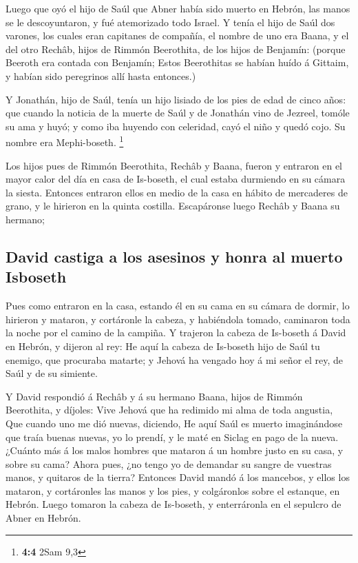  Luego que oyó el hijo de Saúl que Abner había sido muerto
en Hebrón, las manos se le descoyuntaron, y fué atemorizado todo Israel.
 Y tenía el hijo de Saúl dos varones, los cuales eran
capitanes de compañía, el nombre de uno era Baana, y el del otro Rechâb,
hijos de Rimmón Beerothita, de los hijos de Benjamín: (porque Beeroth
era contada con Benjamín;  Estos Beerothitas se habían
huído á Gittaim, y habían sido peregrinos allí hasta entonces.)

 Y Jonathán, hijo de Saúl, tenía un hijo lisiado de los
pies de edad de cinco años: que cuando la noticia de la muerte de Saúl y
de Jonathán vino de Jezreel, tomóle su ama y huyó; y como iba huyendo
con celeridad, cayó el niño y quedó cojo. Su nombre era Mephi-boseth.
\footnote{\textbf{4:4} 2Sam 9,3}

 Los hijos pues de Rimmón Beerothita, Rechâb y Baana,
fueron y entraron en el mayor calor del día en casa de Is-boseth, el
cual estaba durmiendo en su cámara la siesta.  Entonces
entraron ellos en medio de la casa en hábito de mercaderes de grano, y
le hirieron en la quinta costilla. Escapáronse luego Rechâb y Baana su
hermano;

\hypertarget{david-castiga-a-los-asesinos-y-honra-al-muerto-isboseth}{%
\subsection{David castiga a los asesinos y honra al muerto
Isboseth}\label{david-castiga-a-los-asesinos-y-honra-al-muerto-isboseth}}

 Pues como entraron en la casa, estando él en su cama en
su cámara de dormir, lo hirieron y mataron, y cortáronle la cabeza, y
habiéndola tomado, caminaron toda la noche por el camino de la campiña.
 Y trajeron la cabeza de Is-boseth á David en Hebrón, y
dijeron al rey: He aquí la cabeza de Is-boseth hijo de Saúl tu enemigo,
que procuraba matarte; y Jehová ha vengado hoy á mi señor el rey, de
Saúl y de su simiente.

 Y David respondió á Rechâb y á su hermano Baana, hijos de
Rimmón Beerothita, y díjoles: Vive Jehová que ha redimido mi alma de
toda angustia,  Que cuando uno me dió nuevas, diciendo,
He aquí Saúl es muerto imaginándose que traía buenas nuevas, yo lo
prendí, y le maté en Siclag en pago de la nueva.  ¿Cuánto
más á los malos hombres que mataron á un hombre justo en su casa, y
sobre su cama? Ahora pues, ¿no tengo yo de demandar su sangre de
vuestras manos, y quitaros de la tierra?  Entonces David
mandó á los mancebos, y ellos los mataron, y cortáronles las manos y los
pies, y colgáronlos sobre el estanque, en Hebrón. Luego tomaron la
cabeza de Is-boseth, y enterráronla en el sepulcro de Abner en Hebrón.

